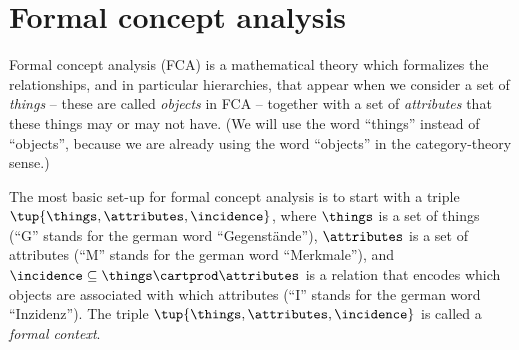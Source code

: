 

    \section{Formal concept analysis}

Formal concept analysis (FCA) is a mathematical theory which formalizes the relationships, and in particular hierarchies, that appear when we consider a set of \emph{things} -- these are called \emph{objects} in FCA -- together with a set of \emph{attributes} that these things may or may not have. (We will use the word ``things'' instead of ``objects'', because we are already using the word ``objects'' in the category-theory sense.) 

The most basic set-up for formal concept analysis is to start with a triple $\tup{\things, \attributes, \incidence}$, where $\things$ is a set of things (``G'' stands for the german word ``Gegenst\"ande''), $\attributes$ is a set of attributes (``M'' stands for the german word ``Merkmale''), and $\incidence \subseteq \things \cartprod \attributes$ is a relation that encodes which objects are associated with which attributes (``I'' stands for the german word ``Inzidenz''). The triple $\tup{\things, \attributes, \incidence}$ is called a \emph{formal context}.

